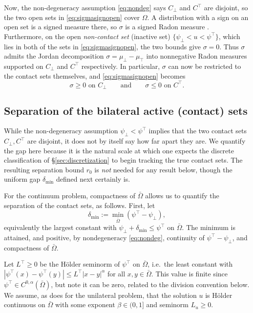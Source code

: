 \documentclass[12pt]{amsart}
\theoremstyle{definition}
\newcommand{\Om}{\Omega}
\newcommand{\psilo}{\psi_\bot}
\newcommand{\psiup}{\psi^\top}
\newcommand{\Cbot}{C_\bot}
\newcommand{\Ctop}{C^\top}
\begin{document}
Now, the non-degeneracy assumption \eqref{eq:nondeg} says $\Cbot$ and $\Ctop$ are disjoint, so the two open sets in \eqref{eq:sigmasignopen} cover $\Om$.  A distribution with a sign on an open set is a signed measure there, so $\sigma$ is a signed Radon measure \cite{EvansGariepy2015}.  Furthermore, on the open \emph{non-contact set} (inactive set) $\{\psilo < u < \psiup\}$, which lies in both of the sets in \eqref{eq:sigmasignopen}, the two bounds give $\sigma = 0$.  Thus $\sigma$ admits the Jordan decomposition $\sigma = \mu_{\bot} - \mu_{\top}$ into nonnegative Radon measures supported on $\Cbot$ and $\Ctop$ respectively.  In particular, $\sigma$ can now be restricted to the contact sets themselves, and \eqref{eq:sigmasignopen} becomes
\begin{equation}
\label{eq:sigmasign}
  \sigma \ge 0 \text{ on } \Cbot \qquad \text{and} \qquad \sigma \le 0 \text{ on } \Ctop.
\end{equation}


\subsection{Separation of the bilateral active (contact) sets}  While the non-degeneracy assumption $\psilo < \psiup$ implies that the two contact sets $\Cbot, \Ctop$ are disjoint, it does not by itself say how far apart they are.  We quantify the gap here because it is the natural scale at which one expects the discrete classification of \S \ref{sec:discretization} to begin tracking the true contact sets.  The resulting separation bound $r_0$ is \emph{not} needed for any result below, though the uniform gap $\delta_{\min}$ defined next certainly is.

For the continuum problem, compactness of $\bar\Om$ allows us to quantify the separation of the contact sets, as follows.  First, let
\begin{equation}
\label{eq:deltamin}
  \delta_{\min} := \min_{\bar\Om} (\psiup - \psilo),
\end{equation}
equivalently the largest constant with $\psilo + \delta_{\min} \le \psiup$ on $\bar\Om$.  The minimum is attained, and positive, by nondegeneracy \eqref{eq:nondeg}, continuity of $\psiup - \psilo$, and compactness of $\bar\Om$.

Let $L^\top \ge 0$ be the H\"older seminorm of $\psiup$ on $\bar\Om$, i.e.\ the least constant with $|\psiup(x) - \psiup(y)| \le L^\top |x-y|^\alpha$ for all $x,y \in \bar\Om$.  This value is finite since $\psiup \in C^{0,\alpha}(\bar\Om)$, but note it can be zero, related to the division convention below.  We assume, as does \cite{NSV03} for the unilateral problem, that the solution $u$ is H\"older continuous on $\bar\Om$ with some exponent $\beta \in (0,1]$ and seminorm $L_u \ge 0$.
\end{document}
